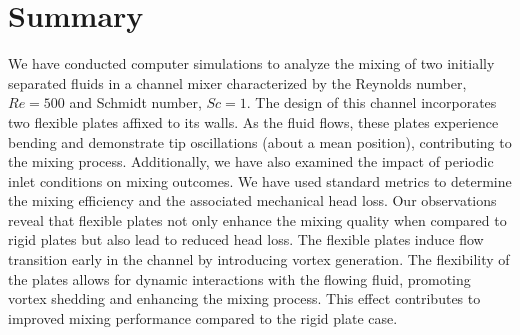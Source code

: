 \documentclass[%
aip,
amsmath,amssymb,
reprint,
]{revtex4-1}
\begin{document}
			\section{Summary}
			We have conducted computer simulations to analyze the mixing of two initially separated fluids in a channel mixer characterized by the Reynolds number, $Re=500$ and Schmidt number, $Sc=1$. The design of this channel incorporates two flexible plates affixed to its walls. As the fluid flows, these plates experience bending and demonstrate tip oscillations (about a mean position), contributing to the mixing process. Additionally, we have also examined the impact of periodic inlet conditions on mixing outcomes. We have used standard metrics to determine the mixing efficiency and the associated mechanical head loss. Our observations reveal that flexible plates not only enhance the mixing quality when compared to rigid plates but also lead to reduced head loss. The flexible plates induce flow transition early in the channel by introducing vortex generation. The flexibility of the plates allows for dynamic interactions with the flowing fluid, promoting vortex shedding and enhancing the mixing process. This effect contributes to improved mixing performance compared to the rigid plate case.	
			
\end{document}
